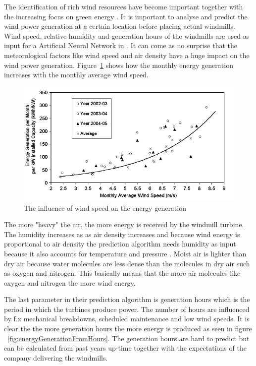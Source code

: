 The identification of rich wind resources have become important together with the increasing focus on green energy \cite{WindPowerGenerationUsingANN}. It is important to analyse and predict the wind power generation at a certain location before placing actual windmills. 
Wind speed, relative humidity and generation hours of the windmills are used as input for a Artificial Neural Network in \cite{WindPowerGenerationUsingANN}. It can come as no surprise that the meteorological factors like wind speed and air density have a huge impact on the wind power generation. Figure~\ref{fig:energyGeneration} shows how the monthly energy generation increases with the monthly average wind speed. 

\begin{figure}[h!]
\centering
\includegraphics[width=0.8\linewidth,natwidth=898,natheight=587]{billeder/EnergyGenerationVsWindSpeed.png}
\caption{The influence of wind speed on the energy generation \cite{WindPowerGenerationUsingANN}}
\label{fig:energyGeneration}
\end{figure} 

The more "heavy" the air, the more energy is received by the windmill turbine. The humidity increases as as air density increases and because wind energy is proportional to air density the prediction algorithm needs humidity as input because it also accounts for temperature and pressure \cite{AirDensityInForecast}. Moist air is lighter than dry air because water molecules are less dense than the molecules in dry air such as oxygen and nitrogen. This basically means that the more air molecules like oxygen and nitrogen the more wind energy.

The last parameter in their prediction algorithm is generation hours which is the period in which the turbines produce power. The number of hours are influenced by f.x mechanical breakdowns, scheduled maintenance and low wind speeds. It is clear the the more generation hours the more energy is produced as seen in figure ~\ref{fig:energyGenerationFromHours}. The generation hours are hard to predict but can be calculated from past years up-time together with the expectations of the company delivering the windmills.  

